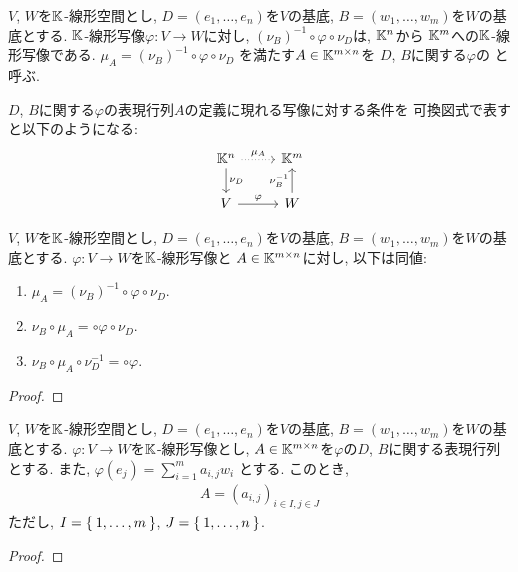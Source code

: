 \begin{definition}
  $V$, $W$を$\mathbb{K}$-線形空間とし,
  $D=(e_1,\ldots,e_n)$を$V$の基底,
  $B=(w_1,\ldots,w_m)$を$W$の基底とする.
  $\mathbb{K}$-線形写像$\varphi\colon V\to W$に対し,
  $(\nu_B)^{-1}\circ \varphi\circ \nu_D$は,
  $\mathbb{K}^n$から $\mathbb{K}^m$への$\mathbb{K}$-線形写像である.
  $\mu_A=(\nu_B)^{-1}\circ \varphi\circ \nu_D$
  を満たす$A\in\mathbb{K}^{m\times n}$を
  $D$, $B$に関する$\varphi$の
 と呼ぶ.
\end{definition}
\begin{remark}
  $D$, $B$に関する$\varphi$の表現行列$A$の定義に現れる写像に対する条件を
  可換図式で表すと以下のようになる:
  \begin{align*}
  \begin{tikzcd}[ampersand replacement=\&]
  \KK^n \arrow[r, "\mu_{A}", dotted] \arrow[d, "\nu_{D}"] \& \KK^m  \\
  V \arrow[r, "\varphi"] \& W \arrow[u,"\nu_B^{-1}"]
  \end{tikzcd}
  \end{align*}
\end{remark}
\begin{lemma}
  $V$, $W$を$\mathbb{K}$-線形空間とし,
  $D=(e_1,\ldots,e_n)$を$V$の基底,
  $B=(w_1,\ldots,w_m)$を$W$の基底とする.
  $\varphi\colon V\to W$を$\mathbb{K}$-線形写像と
  $A\in\mathbb{K}^{m\times n}$に対し,
  以下は同値:
\begin{enumerate}
\item   $\mu_A=(\nu_B)^{-1}\circ \varphi\circ \nu_D$.
\item   $\nu_B\circ \mu_A=\circ \varphi\circ \nu_D$.
\item   $\nu_B\circ \mu_A \circ \nu_D^{-1}=\circ \varphi$.
\end{enumerate}
\end{lemma}
\begin{proof}\end{proof}

\begin{prop}
  $V$, $W$を$\mathbb{K}$-線形空間とし,
  $D=(e_1,\ldots,e_n)$を$V$の基底,
  $B=(w_1,\ldots,w_m)$を$W$の基底とする.
  $\varphi\colon V\to W$を$\mathbb{K}$-線形写像とし,
  $A\in\mathbb{K}^{m\times n}$を$\varphi$の$D$, $B$に関する表現行列とする.
  また,
  $\varphi(e_j)=\sum_{i=1}^m a_{i,j} w_i$
  とする.
  このとき,
\begin{align*}
  A=(a_{i,j})_{i\in I, j\in J}
\end{align*}
ただし,
$I=\Set{1,\ldots,m}$,
$J=\Set{1,\ldots,n}$.
\end{prop}
\begin{proof}\end{proof}


